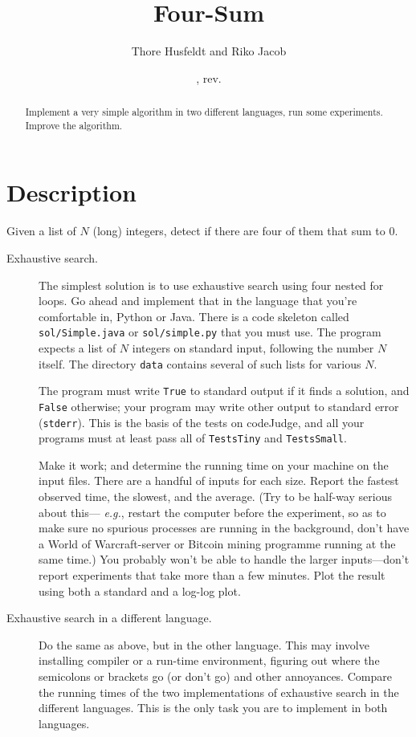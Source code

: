 \documentclass{tufte-handout}
\title{Four-Sum}
\author{Thore Husfeldt and Riko Jacob}
\date{\GITAuthorDate, rev. \GITAbrHash}
\begin{document}
\maketitle
\begin{abstract}
  Implement a very simple algorithm in two different languages, run some experiments.
  Improve the algorithm.
\end{abstract}


 \section{Description}

 Given a list of $N$ (long) integers, detect if there are four of them that sum to $0$.

\begin{description}
  \item[Exhaustive search.]
The simplest solution is to use exhaustive search using four nested for loops.
Go ahead and implement that in the language that you’re comfortable in, Python or Java.
There is a code skeleton called \texttt{sol/Simple.java} or \texttt{sol/simple.py} that you must use.
The program expects a list of $N$ integers on standard input, following the number $N$ itself.
The directory \texttt{data} contains several of such lists for various $N$.

The program must write \texttt{True} to standard output if it finds a solution, and \texttt{False} otherwise;
your program may write other output to standard error (\texttt{stderr}).
This is the basis of the tests on codeJudge, and all your programs must at least pass all of \texttt{TestsTiny} and \texttt{TestsSmall}.

Make it work; and determine the running time on your machine on the input files. 
There are a handful of inputs for each size.
Report the fastest observed time, the slowest, and the average.
(Try to be half-way serious about this--- \emph{e.g.}, restart the computer before the experiment, so as to make sure no spurious processes are running in the background, don’t have a World of Warcraft-server or Bitcoin mining programme running at the same time.)
You probably won’t be able to handle the larger inputs---don’t report experiments that take more than a few minutes.
Plot the result using both a standard and a log-log plot.

\item[Exhaustive search in a different language.]
  Do the same as above, but in the other language.
  This may involve installing compiler or a run-time environment, figuring out where the semicolons or brackets go (or don’t go) and other annoyances.
  Compare the running times of the two implementations of exhaustive search in the different languages.
  This is the only task you are to implement in both languages.


\end{description}
\end{document}
